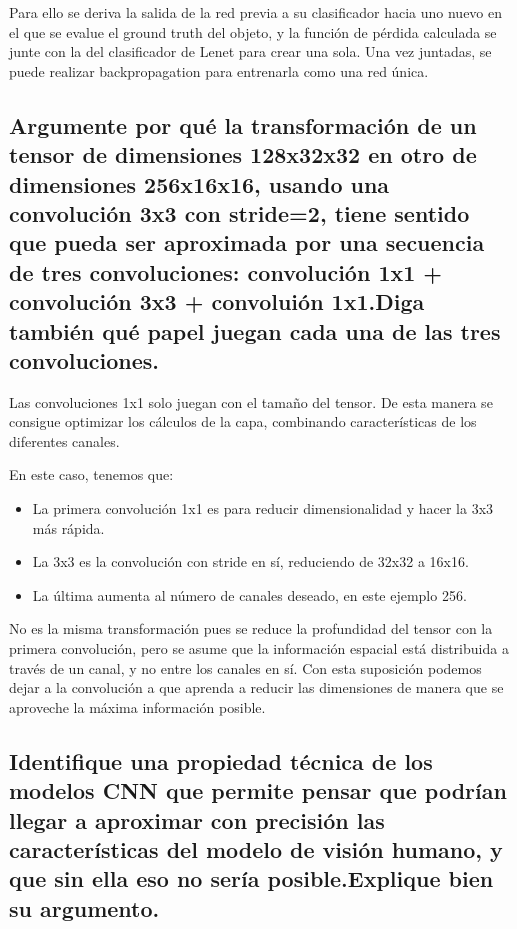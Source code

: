 \documentclass[11pt]{scrartcl} %
\begin{document}
Para ello se deriva la salida de la red previa a su clasificador hacia uno nuevo
en el que se evalue el ground truth del objeto, y la función de pérdida calculada
se junte con la del clasificador de Lenet para crear una sola. Una vez juntadas,
se puede realizar backpropagation para entrenarla como una red única.

\subsection{Argumente por qué la transformación de un tensor de dimensiones
128x32x32 en otro de dimensiones 256x16x16, usando una convolución
3x3 con stride=2, tiene sentido que pueda ser aproximada por una
secuencia de tres convoluciones: convolución 1x1 + convolución 3x3
+ convoluión 1x1.\newline Diga también qué papel juegan cada una de las tres
convoluciones.}


Las convoluciones 1x1 solo juegan con el tamaño del tensor.
De esta manera se consigue optimizar los cálculos de la capa, combinando 
características de los diferentes canales. \newline

En este caso, tenemos que:
\begin{itemize}
	\item La primera convolución 1x1 es para reducir dimensionalidad y hacer la 
	3x3 más rápida.
	\item La 3x3 es la convolución con stride en sí, reduciendo de 32x32 a 16x16.
	\item La última aumenta al número de canales deseado, en este ejemplo 256.
\end{itemize}

No es la misma transformación pues se reduce la profundidad del tensor con la
primera convolución, pero se asume que la información espacial está distribuida
a través de un canal, y no entre los canales en sí. Con esta suposición podemos 
dejar a la convolución a que aprenda a reducir las dimensiones de manera que se aproveche la
máxima información posible.

\newpage 

\subsection{Identifique una propiedad técnica de los modelos CNN que permite
pensar que podrían llegar a aproximar con precisión las
características del modelo de visión humano, y que sin ella eso no
sería posible.\newline Explique bien su argumento.}
\end{document}
